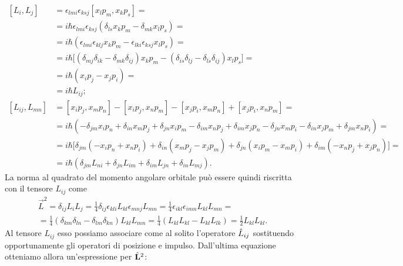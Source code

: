 \begin{equation}
	\begin{split}
		[L_i,L_j]&=\epsilon_{lmi}\epsilon_{ksj}[x_lp_m,x_kp_s]=\\
		&=i\hbar\epsilon_{lmi}\epsilon_{ksj}(\delta_{ls}x_kp_m-\delta_{mk}x_lp_s)=\\
		&=i\hbar(\epsilon_{lmi}\epsilon_{klj}x_kp_m-\epsilon_{lki}\epsilon_{ksj}x_lp_s)=\\
		&=i\hbar\big[(\delta_{mj}\delta_{ik}-\delta_{mk}\delta_{ij})x_kp_m-(\delta_{is}\delta_{lj}-\delta_{ls}\delta_{ij})x_lp_s\big]=\\
		&=i\hbar(x_ip_j-x_jp_i)=\\
		&=i\hbar L_{ij};\\
		[L_{ij},L_{mn}]&=[x_ip_j,x_mp_n]-[x_ip_j,x_np_m]-[x_jp_i,x_mp_n]+[x_jp_i,x_np_m]=\\
		&=i\hbar(-\delta_{jm}x_ip_n+\delta_{in}x_mp_j+\delta_{jn}x_ip_m-\delta_{im}x_np_j+\delta_{im}x_jp_n-\delta_{jn}x_mp_i-\delta_{in}x_jp_m+\delta_{jm}x_np_i)=\\
		&=i\hbar\big[\delta_{jm}(-x_ip_n+x_np_i)+\delta_{in}(x_mp_j-x_jp_m)+\delta_{jn}(x_ip_m-x_mp_i)+\delta_{im}(-x_np_j+x_jp_n)\big]=\\
		&=i\hbar(\delta_{jm}L_{ni}+\delta_{jn}L_{im}+\delta_{im}L_{jn}+\delta_{in}L_{mj}).
	\end{split}
\end{equation}
La norma al quadrato del momento angolare orbitale può essere quindi riscritta con il tensore $L_{ij}$ come
\begin{multline}
	\vec L^2=\delta_{ij}L_iL_j=\frac14\delta_{ij}\epsilon_{kli}L_{kl}\epsilon_{mnj}L_{mn}=\frac14\epsilon_{ikl}\epsilon_{imn}L_{kl}L_{mn}=\\
	=\frac14(\delta_{km}\delta_{ln}-\delta_{lm}\delta_{kn})L_{kl}L_{mn}=\frac14(L_{kl}L_{kl}-L_{kl}L_{lk})=\frac12L_{kl}L_{kl}.
\end{multline}
Al tensore $L_{ij}$ esso possiamo associare come al solito l'operatore $\hat{L}_{ij}$ sostituendo opportunamente gli operatori di posizione e impulso.
Dall'ultima equazione otteniamo allora un'espressione per $\hat{\mathbf{L}}^2$:
